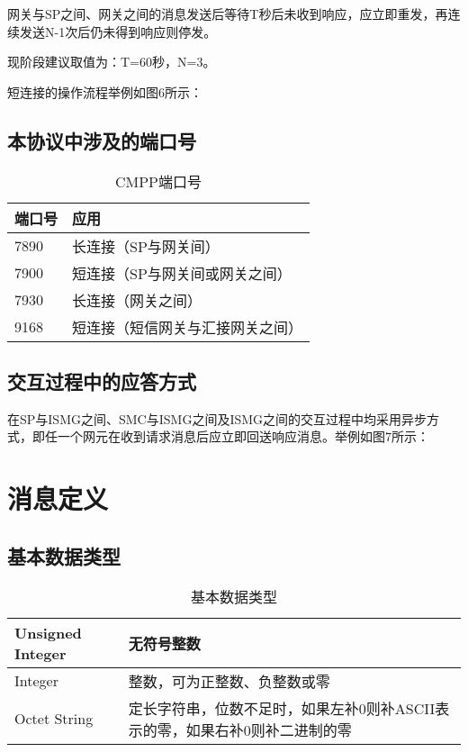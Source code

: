 \documentclass[11pt]{book} %
\begin{document}
网关与SP之间、网关之间的消息发送后等待T秒后未收到响应，应立即重发，再连续发送N-1次后仍未得到响应则停发。

现阶段建议取值为：T=60秒，N=3。
    
短连接的操作流程举例如图6所示：



\section{本协议中涉及的端口号}

\begin{table}[htbp]
\centering
\caption{CMPP端口号}
\begin{tabular}{|l|l|}
\hline
端口号 & 应用\\
\hline
7890&长连接（SP与网关间）\\
\hline
7900 &短连接（SP与网关间或网关之间）\\
\hline
7930&长连接（网关之间）\\
\hline
9168&短连接（短信网关与汇接网关之间）\\
\hline
\end{tabular}
\end{table}


\section{交互过程中的应答方式}

在SP与ISMG之间、SMC与ISMG之间及ISMG之间的交互过程中均采用异步方式，即任一个网元在收到请求消息后应立即回送响应消息。举例如图7所示： 



\chapter{消息定义}

\section{基本数据类型}

\begin{table}[htbp]
\centering
\caption{基本数据类型}
\begin{tabular}{|m{80pt}|m{250pt}|}
\hline
Unsigned Integer&无符号整数\\
\hline
Integer&整数，可为正整数、负整数或零\\
\hline
Octet String&定长字符串，位数不足时，如果左补0则补ASCII表示的零，如果右补0则补二进制的零\\
\hline
\end{tabular}
\end{table}
\end{document}
